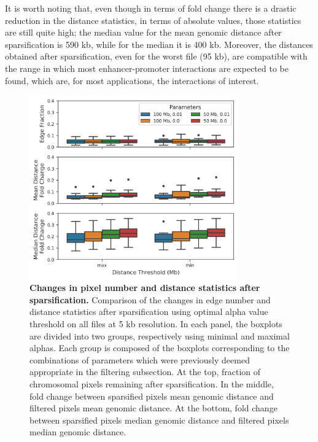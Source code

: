 It is worth noting that, even though in terms of fold change there is a drastic reduction in the distance statistics, in terms of absolute values, those statistics are still quite high; the median value for the mean genomic distance after sparsification is 590 kb, while for the median it is 400 kb. Moreover, the distances obtained after sparsification, even for the worst file (95 kb), are compatible with the range in which most enhancer-promoter interactions are expected to be found, which are, for most applications, the interactions of interest.

\begin{figure}[ht]
  \centering
  \includegraphics[width=0.8\textwidth]{sparsification_stats.png}
  \caption{\textbf{Changes in pixel number and distance statistics after sparsification.} Comparison of the changes in edge number and distance statistics after sparsification using optimal alpha value threshold on all files at 5 kb resolution. In each panel, the boxplots are divided into two groups, respectively using minimal and maximal alphas. Each group is composed of the boxplots corresponding to the combinations of parameters which were previously deemed appropriate in the filtering subsection. At the top, fraction of chromosomal pixels remaining after sparsification. In the middle, fold change between sparsified pixels mean genomic distance and filtered pixels mean genomic distance. At the bottom, fold change between sparsified pixels median genomic distance and filtered pixels median genomic distance.}
  \label{fig:sparsification}
\end{figure}


